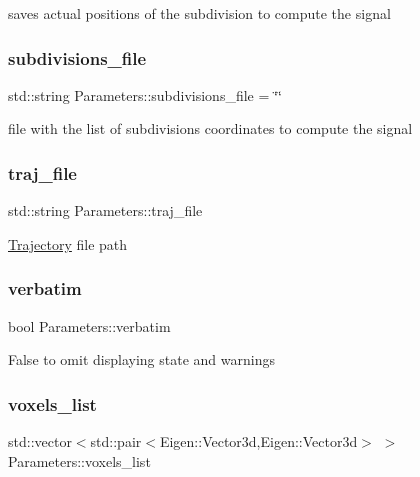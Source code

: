 saves actual positions of the subdivision to compute the signal \mbox{\label{class_parameters_a1733bfcb8391c494b7b1a317dfda5e44}} 
\subsubsection{\texorpdfstring{subdivisions\+\_\+file}{subdivisions\_file}}
{\footnotesize\ttfamily std\+::string Parameters\+::subdivisions\+\_\+file = \char`\"{}\char`\"{}}

file with the list of subdivisions coordinates to compute the signal \mbox{\label{class_parameters_a75346dc3b7a41548a2f9e0560343df24}} 
\subsubsection{\texorpdfstring{traj\+\_\+file}{traj\_file}}
{\footnotesize\ttfamily std\+::string Parameters\+::traj\+\_\+file}

\hyperlink{class_trajectory}{Trajectory} file path \mbox{\label{class_parameters_aabce43eb8376a94a8e765da99b58d003}} 
\subsubsection{\texorpdfstring{verbatim}{verbatim}}
{\footnotesize\ttfamily bool Parameters\+::verbatim}

False to omit displaying state and warnings \mbox{\label{class_parameters_aefbd07d8501ebb9311bbb1ea7c37be26}} 
\subsubsection{\texorpdfstring{voxels\+\_\+list}{voxels\_list}}
{\footnotesize\ttfamily std\+::vector$<$std\+::pair$<$Eigen\+::\+Vector3d,Eigen\+::\+Vector3d$>$ $>$ Parameters\+::voxels\+\_\+list}

